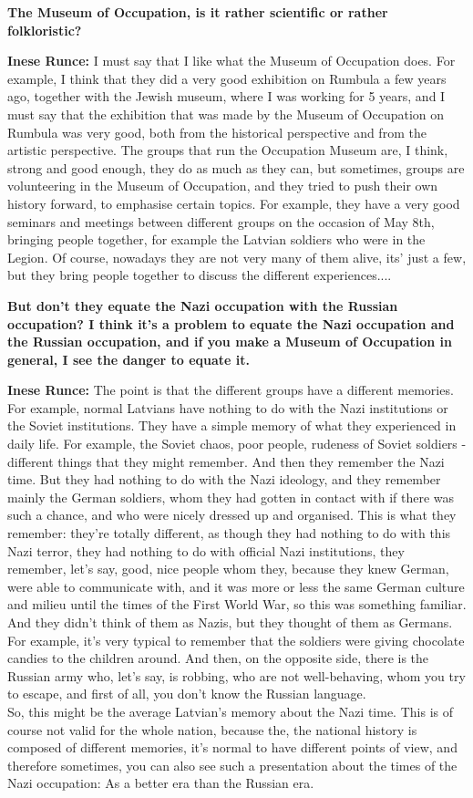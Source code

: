 \textbf{The Museum of Occupation, is it rather scientific or rather folkloristic?}

\textbf{Inese Runce:} I must say that I like what the Museum of Occupation does. For example, I think that they did a very good exhibition on Rumbula a few years ago, together with the Jewish museum, where I was working for 5 years, and I must say that the exhibition that was made by the Museum of Occupation on Rumbula was very good, both from the historical perspective and from the artistic perspective. The groups that run the Occupation Museum are, I think, strong and good enough, they do as much as they can, but sometimes, groups are volunteering in the Museum of Occupation, and they tried to push their own  history forward, to emphasise certain topics. For example, they have a very good seminars and meetings between different groups on the occasion of May 8th, bringing people together, for example the Latvian soldiers who were in the Legion. Of course, nowadays they are not very many of them alive, its' just a few, but they bring people together to discuss the different experiences....

\textbf{But don't they equate the Nazi occupation with the Russian occupation? I think it's a problem to equate the Nazi occupation and the Russian occupation, and if you make a Museum of Occupation in general, I see the danger to equate it.} 
 
\textbf{Inese Runce:} The point is that the different groups have a different memories. For example, normal Latvians have nothing to do with the Nazi institutions or the Soviet institutions. They have a simple memory of what they experienced in daily life.  For example, the Soviet chaos, poor people, rudeness of Soviet soldiers - different things that they might remember. And then they remember the Nazi time. But they had nothing to do with the Nazi ideology, and they remember mainly the German soldiers, whom they had gotten in contact with if there was such a chance, and who were nicely  dressed up and organised. This is what they remember: they're totally different, as though they had nothing to do with this Nazi terror, they had nothing to do with official Nazi institutions, they remember, let's say, good, nice people whom they, because they knew German, were able to communicate with, and it was more or less the same German culture and milieu until the times of the First World War, so this was something familiar. And they didn't think of them as Nazis, but they thought of them as Germans. For example,  it's very typical to remember that the soldiers were giving chocolate  candies to the children around. And then, on the opposite side, there is the Russian army who, let's say, is robbing, who are not well-behaving, whom you try to escape, and first of all, you don't know the Russian language. \\
So, this might be the average Latvian's memory about the Nazi time. This is of course not valid for the whole nation, because the, the national history is composed of different memories, it’s normal to have different points of view, and therefore sometimes, you can also see such a presentation about the times of the Nazi occupation: As a better era than the Russian era.
 
